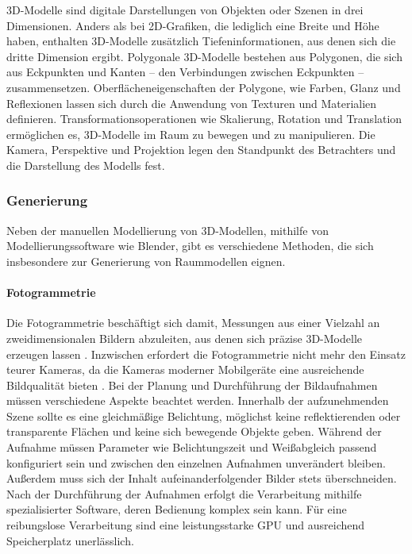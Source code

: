 3D-Modelle sind digitale Darstellungen von Objekten oder Szenen in drei Dimensionen. Anders als bei 2D-Grafiken, die lediglich eine Breite und Höhe haben, enthalten 3D-Modelle zusätzlich Tiefeninformationen, aus denen sich die dritte Dimension ergibt. Polygonale 3D-Modelle bestehen aus Polygonen, die sich aus Eckpunkten und Kanten – den Verbindungen zwischen Eckpunkten – zusammensetzen. Oberflächeneigenschaften der Polygone, wie Farben, Glanz und Reflexionen lassen sich durch die Anwendung von Texturen und Materialien definieren. Transformationsoperationen wie Skalierung, Rotation und Translation ermöglichen es, 3D-Modelle im Raum zu bewegen und zu manipulieren. Die Kamera, Perspektive und Projektion legen den Standpunkt des Betrachters und die Darstellung des Modells fest.\cite[S.~8-16]{Parisi2014}

\subsubsection{Generierung}
Neben der manuellen Modellierung von 3D-Modellen, mithilfe von Modellierungssoftware wie Blender, gibt es verschiedene Methoden, die sich insbesondere zur Generierung von Raummodellen eignen.

\paragraph{Fotogrammetrie}

Die Fotogrammetrie beschäftigt sich damit, Messungen aus einer Vielzahl an zweidimensionalen Bildern abzuleiten, aus denen sich präzise 3D-Modelle erzeugen lassen \cite[S.~19]{Aber2010}. Inzwischen erfordert die Fotogrammetrie nicht mehr den Einsatz teurer Kameras, da die Kameras moderner Mobilgeräte eine ausreichende Bildqualität bieten \cite{Cohrs2021}. Bei der Planung und Durchführung der Bildaufnahmen müssen verschiedene Aspekte beachtet werden. Innerhalb der aufzunehmenden Szene sollte es eine gleichmäßige Belichtung, möglichst keine reflektierenden oder transparente Flächen und keine sich bewegende Objekte geben. Während der Aufnahme müssen Parameter wie Belichtungszeit und Weißabgleich passend konfiguriert sein und zwischen den einzelnen Aufnahmen unverändert bleiben. Außerdem muss sich der Inhalt aufeinanderfolgender Bilder stets überschneiden.\cite{Cohrs2021b} Nach der Durchführung der Aufnahmen erfolgt die Verarbeitung mithilfe spezialisierter Software, deren Bedienung komplex sein kann. Für eine reibungslose Verarbeitung sind eine leistungsstarke \ac{GPU} und ausreichend Speicherplatz unerlässlich.\cite{Cohrs2021c}

